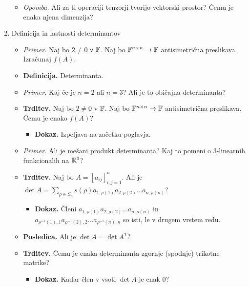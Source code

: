 \begin{enumerate}
\begin{itemize}
        \item \colorbox{yellow!30}{\emph{Opomba.}} Ali za ti operaciji tenzorji tvorijo vektorski prostor? Čemu je enaka njena dimenzija?
    \end{itemize}
    \item Definicija in lastnosti determinantov
    \begin{itemize}
        \item \colorbox{yellow!30}{\emph{Primer.}} Naj bo $2 \neq 0$ v $\mathbb{F}$. Naj bo $\mathbb{F}^{n \times n} \to \mathbb{F}$ antisimetrična preslikava. Izračunaj $f(A)$.
        \item \colorbox{purple!30}{\textbf{Definicija.}} Determinanta.
        \item \colorbox{yellow!30}{\emph{Primer.}} Kaj če je $n=2$ ali $n=3$? Ali je to običajna determinanta?
        \item \colorbox{blue!30}{\textbf{Trditev.}} Naj bo $2 \neq 0$ v $\mathbb{F}$. Naj bo $\mathbb{F}^{n \times n} \to \mathbb{F}$ antisimetrična preslikava. Čemu je enako $f(A)$?
        \begin{itemize}
            \item \colorbox{green!30}{\textbf{Dokaz.}} Izpeljava na začetku poglavja.
        \end{itemize}
        \item \colorbox{yellow!30}{\emph{Primer.}} Ali je mešani produkt determinanta? Kaj to pomeni o $3$-linearnih funkcionalih na $\mathbb{R}^3$?
        \item \colorbox{blue!30}{\textbf{Trditev.}} Naj bo $A = [a_{ij}]_{i, j = 1}^n$. Ali je $\det A = \sum_{\rho \in S_n} s(\rho)a_{1, \rho(1)}a_{2, \rho(2)}\ldots a_{n, \rho(n)}$?
        \begin{itemize}
            \item \colorbox{green!30}{\textbf{Dokaz.}} Členi $a_{1, \rho(1)}a_{2, \rho(2)}\ldots a_{n, \rho(n)}$ in $a_{\rho^{-1}(1), 1} a_{\rho^{-1}(2),2}\ldots a_{\rho^{-1}(n), n}$ so isti, le v drugem vrstem redu.
        \end{itemize}
        \item \colorbox{orange!30}{\textbf{Posledica.}} Ali je $\det A = \det A^T$?
        \item \colorbox{blue!30}{\textbf{Trditev.}} Čemu je enaka determinanta zgornje (spodnje) trikotne matrike?
        \begin{itemize}
            \item \colorbox{green!30}{\textbf{Dokaz.}} Kadar člen v vsoti $\det A$ je enak $0$? 
        \end{itemize}

\end{itemize}
\end{enumerate}
